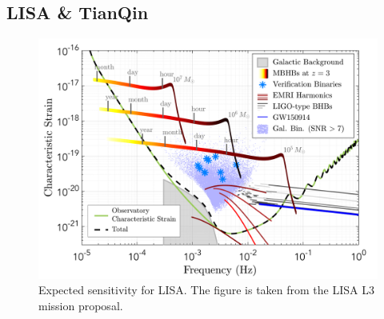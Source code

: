 \subsection{LISA \& TianQin}

\begin{figure}[h]
    \centering
    \includegraphics[width=0.7\linewidth]{Images/lisa_frequency_sensitivity.png}
    \caption{Expected sensitivity for LISA. The figure is taken from the LISA L3 mission proposal.}
    \label{LISA_F_sensitivity}
\end{figure} 